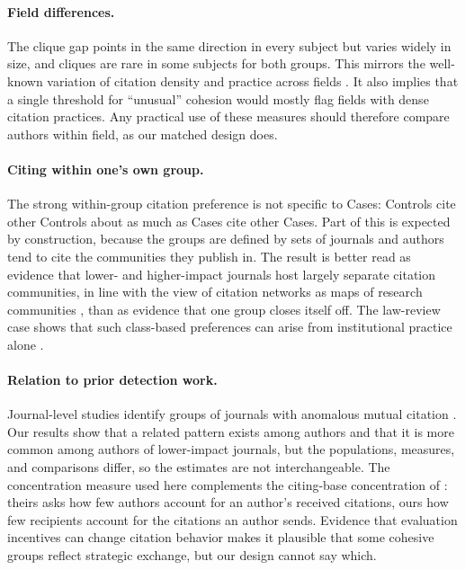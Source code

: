 \documentclass[12pt]{article}
\begin{document}
\paragraph{Field differences.}  The clique gap points in the same direction in every subject but varies widely in size, and cliques are rare in some subjects for both groups.  This mirrors the well-known variation of citation density and practice across fields \parencite{Waltman2016}.  It also implies that a single threshold for ``unusual'' cohesion would mostly flag fields with dense citation practices.  Any practical use of these measures should therefore compare authors within field, as our matched design does.

\paragraph{Citing within one's own group.}  The strong within-group citation preference is not specific to Cases: Controls cite other Controls about as much as Cases cite other Cases.  Part of this is expected by construction, because the groups are defined by sets of journals and authors tend to cite the communities they publish in.  The result is better read as evidence that lower- and higher-impact journals host largely separate citation communities, in line with the view of citation networks as maps of research communities \parencite{Price1965,Boyack2010}, than as evidence that one group closes itself off.  The law-review case shows that such class-based preferences can arise from institutional practice alone \parencite{Perez2019}.

\paragraph{Relation to prior detection work.}  Journal-level studies identify groups of journals with anomalous mutual citation \parencite{Kojaku2021,heneberg2016,Fister2016}.  Our results show that a related pattern exists among authors and that it is more common among authors of lower-impact journals, but the populations, measures, and comparisons differ, so the estimates are not interchangeable.  The concentration measure used here complements the citing-base concentration of \textcite{Evdaimon2024}: theirs asks how few authors account for an author's received citations, ours how few recipients account for the citations an author sends.  Evidence that evaluation incentives can change citation behavior \parencite{Baccini2019,Seeber2019} makes it plausible that some cohesive groups reflect strategic exchange, but our design cannot say which.
\end{document}
